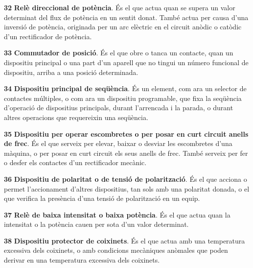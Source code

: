 \begin{multicols}{2}
\begin{list}{}
\item[\textbf{32}]  \textbf{Rel\`{e} direccional de
pot\`{e}ncia}. \'{E}s el que actua quan se supera un valor determinat del
flux de pot\`{e}ncia en un sentit donat. Tamb\'{e} actua per causa d'una
inversi\'{o} de pot\`{e}ncia, originada per un arc el\`{e}ctric en el circuit
an\`{o}dic o cat\`{o}dic d'un rectificador de pot\`{e}ncia.

\item[\textbf{33}]  \textbf{Commutador de posici\'{o}}. \'{E}s el que
obre o tanca un contacte, quan un dispositiu principal o una part d'un aparell que no tingui un n\'{u}mero funcional de dispositiu, arriba a una posici\'{o} determinada.

\item[\textbf{34}]  \textbf{Dispositiu principal de
 seq\"{u}\`{e}ncia}. \'{E}s un element, com ara un selector de contactes m\'{u}ltiples, o com ara un
 dispositiu programable,
 que fixa la seq\"{u}\`{e}ncia d'operaci\'{o}
de dispositius principals, durant l'arrencada i la parada, o durant altres operacions
que requereixin una seq\"{u}\`{e}ncia.

\item[\textbf{35}]   \textbf{Dispositiu per operar escombretes o per posar en curt
circuit anells de frec}. \'{E}s el que serveix per elevar, baixar o
desviar les escombretes d'una m\`{a}quina, o per posar en curt circuit
els seus anells de frec. Tamb\'{e} serveix per fer o desfer els
contactes d'un rectificador mec\`{a}nic.

\item[\textbf{36}] 
 \textbf{Dispositiu de
polaritat o de tensi\'{o} de polaritzaci\'{o}}. \'{E}s el que acciona o permet
l'accionament d'altres dispositius, tan sols amb una polaritat
donada, o el que verifica la pres\`{e}ncia d'una tensi\'{o} de polaritzaci\'{o}
en un equip.

\item[\textbf{37}]  \textbf{Rel\`{e} de baixa
intensitat o baixa pot\`{e}ncia}. \'{E}s el que actua quan la intensitat o la pot\`{e}ncia cauen per
sota d'un valor determinat.

\item[\textbf{38}] 
\textbf{Dispositiu protector de coixinets}. \'{E}s el que actua amb una
temperatura excessiva dels coixinets, o amb condicions mec\`{a}niques
an\`{o}males que poden derivar en una temperatura excessiva dels
coixinets.


\end{list}
\end{multicols}
